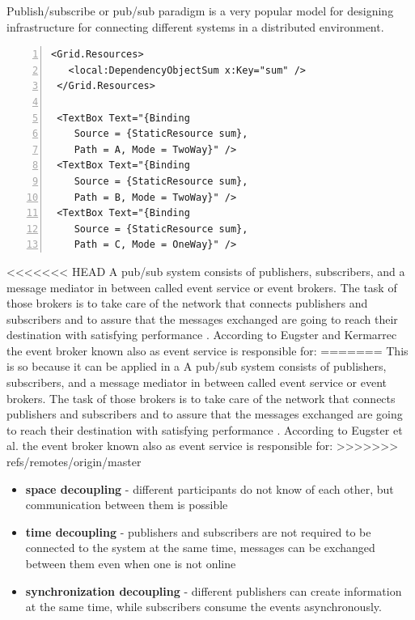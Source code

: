 \documentclass{sigplanconf}
\begin{document}
Publish/subscribe or pub/sub paradigm is a very popular model for designing infrastructure for connecting different systems in a distributed environment.

\bigskip

\begin{lstlisting}[frame=single, caption={DependencyObjectSum.xaml. Here three different text boxes are defined for testing the code from the previous listing},captionpos=b,linewidth=\columnwidth, basicstyle=\small, morekeywords={Source, Path}, keywordstyle=\color{blue},
numbers=left, numbersep=5pt]
 <Grid.Resources>
   <local:DependencyObjectSum x:Key="sum" />
 </Grid.Resources>

 <TextBox Text="{Binding 
	Source = {StaticResource sum}, 
	Path = A, Mode = TwoWay}" />
 <TextBox Text="{Binding 
	Source = {StaticResource sum}, 
	Path = B, Mode = TwoWay}" />
 <TextBox Text="{Binding 
	Source = {StaticResource sum}, 
	Path = C, Mode = OneWay}" />

\end{lstlisting}

<<<<<<< HEAD
A pub/sub system consists of publishers, subscribers, and a message mediator in between called event service or event brokers. The task of those brokers is to take care of the network that connects publishers and subscribers and to assure that the messages exchanged are going to reach their destination with satisfying performance \cite{pubsub1}. According to Eugster and Kermarrec \cite{pubsub4} the event broker known also as event service is responsible for:
=======
 This is so because it can be applied in a  A pub/sub system consists of publishers, subscribers, and a message mediator in between called event service or event brokers. The task of those brokers is to take care of the network that connects publishers and subscribers and to assure that the messages exchanged are going to reach their destination with satisfying performance \cite{pubsub1}. According to  Eugster et al. \cite{pubsub4} the event broker known also as event service is responsible for:
>>>>>>> refs/remotes/origin/master

\begin{itemize} \itemsep1pt \parskip0pt 
  \item \textbf{space decoupling} - different participants do not know of each other, but communication between them is possible
  \item \textbf{time decoupling} - publishers and subscribers are not required to be connected to the system at the same time, messages can be exchanged between them even when one is not online
  \item \textbf{synchronization decoupling} - different publishers can create information at the same time, while subscribers consume the events asynchronously.
\end{itemize}
\end{document}
